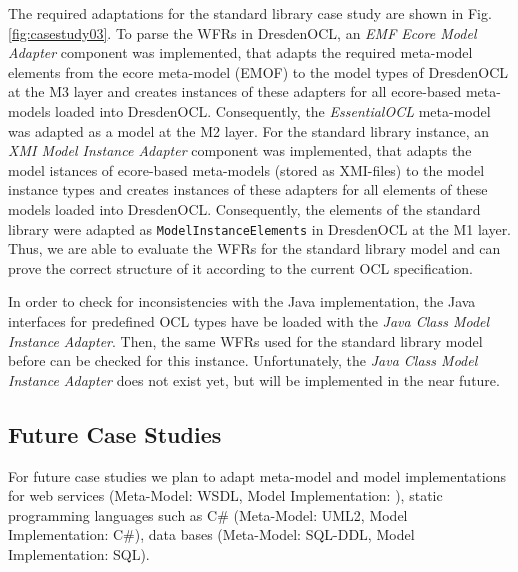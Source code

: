 The required adaptations for the standard library case study are shown in Fig. \ref{fig:casestudy03}.
To parse the WFRs in DresdenOCL, an \textit{EMF Ecore Model Adapter} component was implemented, that 
adapts the required meta-model elements from the ecore meta-model (EMOF) to the model 
types of DresdenOCL at the M3 layer and creates instances of these adapters for all ecore-based
meta-models loaded into DresdenOCL. 
Consequently, the \textit{EssentialOCL} meta-model was adapted as a model at the M2 layer.
For the standard library instance, an \textit{XMI Model Instance Adapter} component was implemented,
that adapts the model istances of ecore-based meta-models (stored as XMI-files)
to the model instance types and creates instances of these adapters for all elements of these models
loaded into DresdenOCL. Consequently, the elements of the standard library
were adapted as \texttt{ModelInstanceElements} in DresdenOCL at the M1 layer.
Thus, we are able to evaluate the WFRs for the standard library model and can prove the correct 
structure of it according to the current OCL specification. 

In order to check for inconsistencies with the Java implementation, the Java interfaces 
for predefined OCL types have  be loaded with the \textit{Java Class Model Instance Adapter}. Then, the same WFRs 
used for the standard library model before can be checked for this instance. 
Unfortunately, the \textit{Java Class Model Instance Adapter} does not exist yet, but will be 
implemented in the near future.


\subsection{Future Case Studies}

For future case studies we plan to adapt meta-model and model implementations for web services (Meta-Model: WSDL, Model Implementation: ), static programming languages such as C\# (Meta-Model: UML2, Model Implementation: C\#), data bases (Meta-Model: SQL-DDL, Model Implementation: SQL). 

